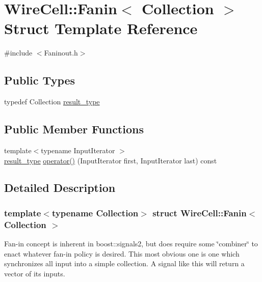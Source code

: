 \hypertarget{struct_wire_cell_1_1_fanin}{}\section{Wire\+Cell\+:\+:Fanin$<$ Collection $>$ Struct Template Reference}
\label{struct_wire_cell_1_1_fanin}


{\ttfamily \#include $<$Faninout.\+h$>$}

\subsection*{Public Types}
\begin{DoxyCompactItemize}
\item 
typedef Collection \hyperlink{struct_wire_cell_1_1_fanin_aa5da112620a039252591b5d26e49bf7a}{result\+\_\+type}
\end{DoxyCompactItemize}
\subsection*{Public Member Functions}
\begin{DoxyCompactItemize}
\item 
{\footnotesize template$<$typename Input\+Iterator $>$ }\\\hyperlink{struct_wire_cell_1_1_fanin_aa5da112620a039252591b5d26e49bf7a}{result\+\_\+type} \hyperlink{struct_wire_cell_1_1_fanin_aad94a942146c713fb60d6b85046cbbb9}{operator()} (Input\+Iterator first, Input\+Iterator last) const
\end{DoxyCompactItemize}


\subsection{Detailed Description}
\subsubsection*{template$<$typename Collection$>$\newline
struct Wire\+Cell\+::\+Fanin$<$ Collection $>$}

Fan-\/in concept is inherent in boost\+::signals2, but does require some \char`\"{}combiner\char`\"{} to enact whatever fan-\/in policy is desired. This most obvious one is one which synchronizes all input into a simple collection. A signal like this will return a vector of its inputs.

